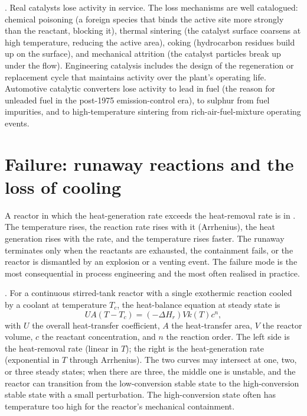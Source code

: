 . Real catalysts lose
activity in service. The loss mechanisms are well catalogued:
chemical poisoning (a foreign species that binds the active site
more strongly than the reactant, blocking it), thermal sintering
(the catalyst surface coarsens at high temperature, reducing the
active area), coking (hydrocarbon residues build up on the surface),
and mechanical attrition (the catalyst particles break up under the
flow). Engineering catalysis includes the design of the regeneration
or replacement cycle that maintains activity over the plant's
operating life. Automotive catalytic converters lose activity to
lead in fuel (the reason for unleaded fuel in the post-1975
emission-control era), to sulphur from fuel impurities, and to
high-temperature sintering from rich-air-fuel-mixture operating
events.

\section{Failure: runaway reactions and the loss of cooling}

A reactor in which the heat-generation rate exceeds the heat-removal
rate is in . The temperature rises, the
reaction rate rises with it (Arrhenius), the heat generation rises
with the rate, and the temperature rises faster. The runaway
terminates only when the reactants are exhausted, the containment
fails, or the reactor is dismantled by an explosion or a venting
event. The failure mode is the most consequential in process
engineering and the most often realised in practice.

. For a continuous stirred-tank
reactor with a single exothermic reaction cooled by a coolant at
temperature $T_c$, the heat-balance equation at steady state is
\[
U A (T - T_c) = (-\Delta H_r) V k(T) c^n,
\]
with $U$ the overall heat-transfer coefficient, $A$ the heat-transfer
area, $V$ the reactor volume, $c$ the reactant concentration, and
$n$ the reaction order. The left side is the heat-removal rate (linear
in $T$); the right is the heat-generation rate (exponential in $T$
through Arrhenius). The two curves may intersect at one, two, or
three steady states; when there are three, the middle one is
unstable, and the reactor can transition from the low-conversion
stable state to the high-conversion stable state with a small
perturbation. The high-conversion state often has temperature too
high for the reactor's mechanical containment.

